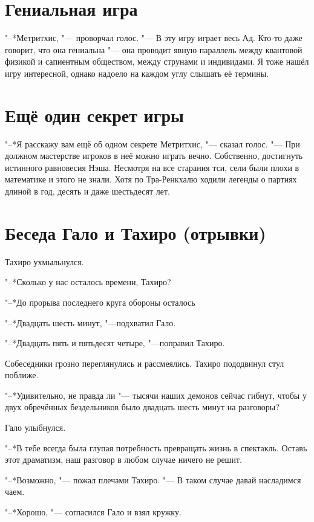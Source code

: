 \documentclass[a4paper,10pt,fleqn]{book}
\newcommand{\ldotst}{\so{...}\xspace}
\begin{document}
\section{Гениальная игра}

"--*Метритхис, "--- проворчал голос.
"--- В эту игру играет весь Ад.
Кто-то даже говорит, что она гениальна "--- она проводит явную параллель между квантовой физикой и сапиентным обществом, между струнами и индивидами.
Я тоже нашёл игру интересной, однако надоело на каждом углу слышать её термины.

\section{Ещё один секрет игры}

"--*Я расскажу вам ещё об одном секрете Метритхис, "--- сказал голос.
"--- При должном мастерстве игроков в неё можно играть вечно.
Собственно, достигнуть истинного равновесия Нэша.
Несмотря на все старания тси, сели были плохи в математике и этого не знали.
Хотя по Тра-Ренкхалю ходили легенды о партиях длиной в год, десять и даже шестьдесят лет.

\section{Беседа Гало и Тахиро (отрывки)}

Тахиро ухмыльнулся.

"--*Сколько у нас осталось времени, Тахиро?

"--*До прорыва последнего круга обороны осталось\ldotst

"--*Двадцать шесть минут, "---подхватил Гало.

"--*Двадцать пять и пятьдесят четыре, "---поправил Тахиро.

Собеседники грозно переглянулись и рассмеялись.
Тахиро пододвинул стул поближе.

"--*Удивительно, не правда ли "--- тысячи наших демонов сейчас гибнут, чтобы у двух обречённых бездельников было двадцать шесть минут на разговоры?

Гало улыбнулся.

"--*В тебе всегда была глупая потребность превращать жизнь в спектакль.
Оставь этот драматизм, наш разговор в любом случае ничего не решит.

"--*Возможно, "--- пожал плечами Тахиро.
"--- В таком случае давай насладимся чаем.

"--*Хорошо, "--- согласился Гало и взял кружку.
\end{document}
